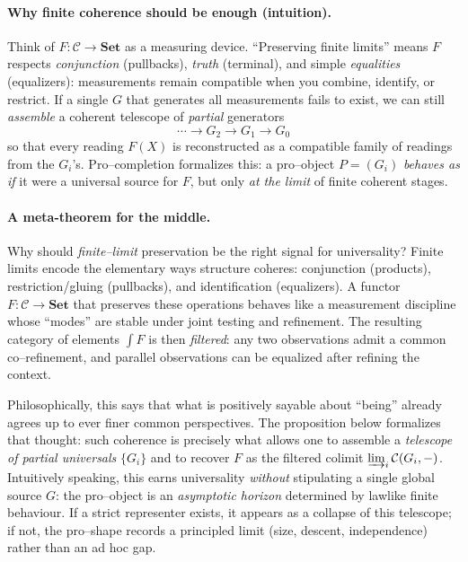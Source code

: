 \documentclass[11pt]{article}
\theoremstyle{upright}
\begin{document}
\paragraph{Why finite coherence should be enough (intuition).}
Think of $F:\mathcal C\to\mathbf{Set}$ as a measuring device. ``Preserving finite limits'' means $F$ respects \emph{conjunction} (pullbacks), \emph{truth} (terminal), and simple \emph{equalities} (equalizers): measurements remain compatible when you combine, identify, or restrict. If a single $G$ that generates all measurements fails to exist, we can still \emph{assemble} a coherent telescope of \emph{partial} generators
\[
\cdots \longrightarrow G_2 \longrightarrow G_1 \longrightarrow G_0
\]
so that every reading $F(X)$ is reconstructed as a compatible family of readings from the $G_i$’s. Pro–completion formalizes this: a pro–object $P=(G_i)$ \emph{behaves as if} it were a universal source for $F$, but only \emph{at the limit} of finite coherent stages.

\paragraph{A meta-theorem for the middle.}
Why should \emph{finite–limit} preservation be the right signal for universality? 
Finite limits encode the elementary ways structure coheres: conjunction (products), restriction/gluing (pullbacks), and identification (equalizers). 
A functor $F:\mathcal C\to\mathbf{Set}$ that preserves these operations behaves like a measurement discipline whose “modes” are stable under joint testing and refinement. 
The resulting category of elements $\int F$ is then \emph{filtered}: any two observations admit a common co–refinement, and parallel observations can be equalized after refining the context. 

Philosophically, this says that what is positively sayable about “being” already agrees up to ever finer common perspectives. 
The proposition below formalizes that thought: such coherence is precisely what allows one to assemble a \emph{telescope of partial universals} $\{G_i\}$ and to recover $F$ as the filtered colimit $\varinjlim_i\mathcal C(G_i,-)$. 
Intuitively speaking, this earns universality \emph{without} stipulating a single global source $G$: the pro–object is an \emph{asymptotic horizon} determined by lawlike finite behaviour. 
If a strict representer exists, it appears as a collapse of this telescope; if not, the pro–shape records a principled limit (size, descent, independence) rather than an ad hoc gap.
\end{document}
